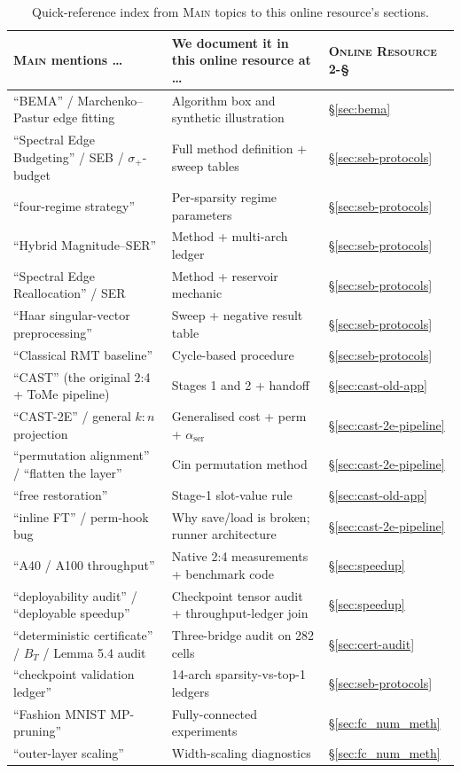 \documentclass[11pt]{article}
\theoremstyle{plain}
\theoremstyle{definition}
\theoremstyle{remark}
\newcommand{\1}{\mathbf{1}}
\newcommand{\mainpaper}{\textsc{Main}}
\newcommand{\methpaper}{\textsc{Online Resource 2}}
\begin{document}
\begin{table}[h]
\centering
\caption{Quick-reference index from \mainpaper{} topics to this online resource's sections.}
\label{tab:quick-index}
\small
\begin{tabularx}{\textwidth}{lXl}
\toprule
\mainpaper{} mentions \ldots & We document it in this online resource at \ldots & \methpaper{}-\S \\
\midrule
``BEMA'' / Marchenko--Pastur edge fitting & Algorithm box and synthetic illustration & \S\ref{sec:bema} \\
``Spectral Edge Budgeting'' / SEB / $\sigma_+$-budget & Full method definition + sweep tables & \S\ref{sec:seb-protocols} \\
``four-regime strategy'' & Per-sparsity regime parameters & \S\ref{sec:seb-protocols} \\
``Hybrid Magnitude--SER'' & Method + multi-arch ledger & \S\ref{sec:seb-protocols} \\
``Spectral Edge Reallocation'' / SER & Method + reservoir mechanic & \S\ref{sec:seb-protocols} \\
``Haar singular-vector preprocessing'' & Sweep + negative result table & \S\ref{sec:seb-protocols} \\
``Classical RMT baseline'' & Cycle-based procedure & \S\ref{sec:seb-protocols} \\
``CAST'' (the original 2:4 + ToMe pipeline) & Stages 1 and 2 + handoff & \S\ref{sec:cast-old-app} \\
``CAST-2E'' / general $k{:}n$ projection & Generalised cost + perm + $\alpha_{\mathrm{ser}}$ & \S\ref{sec:cast-2e-pipeline} \\
``permutation alignment'' / ``flatten the layer'' & Cin permutation method & \S\ref{sec:cast-2e-pipeline} \\
``free restoration'' & Stage-1 slot-value rule & \S\ref{sec:cast-old-app} \\
``inline FT'' / perm-hook bug & Why save/load is broken; runner architecture & \S\ref{sec:cast-2e-pipeline} \\
``A40 / A100 throughput'' & Native 2:4 measurements + benchmark code & \S\ref{sec:speedup} \\
``deployability audit'' / ``deployable speedup'' & Checkpoint tensor audit + throughput-ledger join & \S\ref{sec:speedup} \\
``deterministic certificate'' / $B_T$ / Lemma 5.4 audit & Three-bridge audit on 282 cells & \S\ref{sec:cert-audit} \\
``checkpoint validation ledger'' & 14-arch sparsity-vs-top-1 ledgers & \S\ref{sec:seb-protocols} \\
``Fashion MNIST MP-pruning'' & Fully-connected experiments & \S\ref{sec:fc_num_meth} \\
``outer-layer scaling'' & Width-scaling diagnostics & \S\ref{sec:fc_num_meth} \\
\bottomrule
\end{tabularx}
\end{table}
\end{document}
